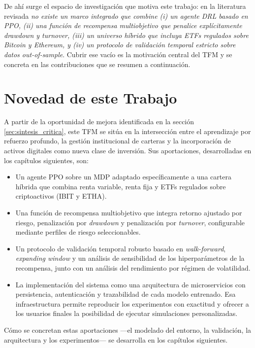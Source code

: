 \documentclass[IB,a4paper]{TFUOC}
\begin{document}
De ahí surge el espacio de investigación que motiva este trabajo: en la literatura revisada \textit{no existe un marco integrado que combine (i) un agente DRL basado en PPO, (ii) una función de recompensa multiobjetivo que penalice explícitamente \textnormal{drawdown} y \textnormal{turnover}, (iii) un universo híbrido que incluya ETFs regulados sobre Bitcoin y Ethereum, y (iv) un protocolo de validación temporal estricto sobre datos out-of-sample}. Cubrir ese vacío es la motivación central del TFM y se concreta en las contribuciones que se resumen a continuación.

\section{Novedad de este Trabajo}
\label{sec:novedad}

A partir de la oportunidad de mejora identificada en la sección \ref{sec:sintesis_critica}, este TFM se sitúa en la intersección entre el aprendizaje por refuerzo profundo, la gestión institucional de carteras y la incorporación de activos digitales como nueva clase de inversión. Sus aportaciones, desarrolladas en los capítulos siguientes, son:

\begin{itemize}
    \item Un agente PPO sobre un MDP adaptado específicamente a una cartera híbrida que combina renta variable, renta fija y ETFs regulados sobre criptoactivos (IBIT y ETHA).
    \item Una función de recompensa multiobjetivo que integra retorno ajustado por riesgo, penalización por \textit{drawdown} y penalización por \textit{turnover}, configurable mediante perfiles de riesgo seleccionables.
    \item Un protocolo de validación temporal robusto basado en \textit{walk-forward}, \textit{expanding window} y un análisis de sensibilidad de los hiperparámetros de la recompensa, junto con un análisis del rendimiento por régimen de volatilidad.
    \item La implementación del sistema como una arquitectura de microservicios con persistencia, autenticación y trazabilidad de cada modelo entrenado. Esa infraestructura permite reproducir los experimentos con exactitud y ofrecer a los usuarios finales la posibilidad de ejecutar simulaciones personalizadas.
\end{itemize}

Cómo se concretan estas aportaciones —el modelado del entorno, la validación, la arquitectura y los experimentos— se desarrolla en los capítulos siguientes.
\end{document}
